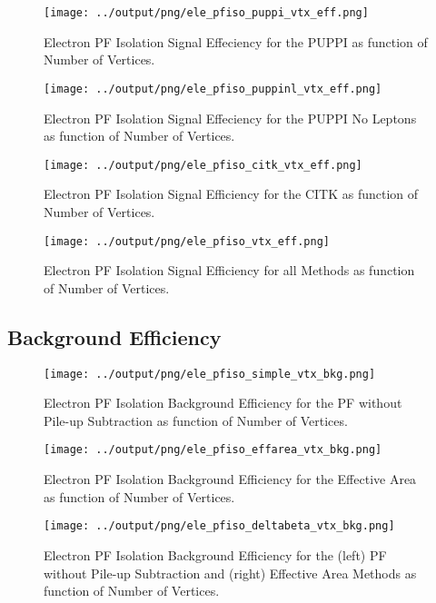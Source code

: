 \documentclass[11pt]{book}
\begin{document}
\begin{figure}[htb]
\centering
\texttt{[image: ../output/png/ele\_pfiso\_puppi\_vtx\_eff.png]}
\caption{Electron PF Isolation Signal Effeciency for the PUPPI as function of Number of Vertices.}
\label{fig:ele_pfiso_vtx_eff_puppi}
\end{figure}

\begin{figure}[htb]
\centering
\texttt{[image: ../output/png/ele\_pfiso\_puppinl\_vtx\_eff.png]}
\caption{Electron PF Isolation Signal Effeciency for the PUPPI No Leptons as function of Number of Vertices.}
\label{fig:ele_pfiso_vtx_eff_puppinl}
\end{figure}

\begin{figure}[htb]
\centering
\texttt{[image: ../output/png/ele\_pfiso\_citk\_vtx\_eff.png]}
\caption{Electron PF Isolation Signal Efficiency for the CITK as function of Number of Vertices.}
\label{fig:ele_pfiso_vtx_eff_citk}
\end{figure}

\begin{figure}[htb]
\centering
\texttt{[image: ../output/png/ele\_pfiso\_vtx\_eff.png]}
\caption{Electron PF Isolation Signal Efficiency for all Methods as function of Number of Vertices.}
\label{fig:ele_pfiso_vtx_eff}
\end{figure}
\clearpage

\subsection{Background Efficiency}
\begin{figure}[htb]
\centering
\texttt{[image: ../output/png/ele\_pfiso\_simple\_vtx\_bkg.png]}
\caption{Electron PF Isolation Background Efficiency for the PF without Pile-up Subtraction as function of Number of Vertices.}
\label{fig:ele_pfiso_vtx_bkg_simple}
\end{figure}

\begin{figure}[htb]
\centering
\texttt{[image: ../output/png/ele\_pfiso\_effarea\_vtx\_bkg.png]}
\caption{Electron PF Isolation Background Efficiency for the Effective Area as function of Number of Vertices.}
\label{fig:ele_pfiso_vtx_bkg_effarea}
\end{figure}

\begin{figure}[htb]
\centering
\texttt{[image: ../output/png/ele\_pfiso\_deltabeta\_vtx\_bkg.png]}
\caption{Electron PF Isolation Background Efficiency for the (left) PF without Pile-up Subtraction and (right) Effective Area Methods as function of Number of Vertices.}
\label{fig:ele_pfiso_vtx_bkg_deltabeta}
\end{figure}
\end{document}
